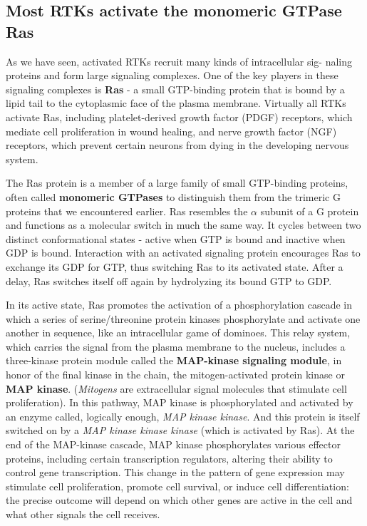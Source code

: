 \subsection{Most RTKs activate the monomeric GTPase Ras}

As we have seen, activated RTKs recruit many kinds of intracellular sig-
naling proteins and form large signaling complexes. One of the key players
in these signaling complexes is \textbf{Ras} - a small GTP-binding protein that is
bound by a lipid tail to the cytoplasmic face of the plasma membrane.
Virtually all RTKs activate Ras, including platelet-derived growth factor
(PDGF) receptors, which mediate cell proliferation in wound healing, and
nerve growth factor (NGF) receptors, which prevent certain neurons from
dying in the developing nervous system.

The Ras protein is a member of a large family of small GTP-binding
proteins, often called \textbf{monomeric GTPases} to distinguish them from
the trimeric G proteins that we encountered earlier. Ras resembles the
$\alpha$ subunit of a G protein and functions as a molecular switch in much
the same way. It cycles between two distinct conformational states -
active when GTP is bound and inactive when GDP is bound.
Interaction with an activated signaling protein encourages Ras
to exchange its GDP for GTP, thus switching Ras to its activated state.
After a delay, Ras switches itself off again by hydrolyzing
its bound GTP to GDP.

In its active state, Ras promotes the activation of a phosphorylation cascade
in which a series of serine/threonine protein kinases phosphorylate
and activate one another in sequence, like an intracellular game of dominoes.
This relay system, which carries the signal from
the plasma membrane to the nucleus, includes a three-kinase protein
module called the \textbf{MAP-kinase signaling module}, in honor of the final
kinase in the chain, the mitogen-activated protein kinase or \textbf{MAP kinase}.
(\textit{Mitogens} are extracellular signal molecules that stimulate cell proliferation).
In this pathway, MAP kinase is phosphorylated and activated by an
enzyme called, logically enough, \textit{MAP kinase kinase}. And this protein is
itself switched on by a \textit{MAP kinase kinase kinase} (which is activated by
Ras). At the end of the MAP-kinase cascade, MAP kinase phosphorylates
various effector proteins, including certain transcription regulators, altering
their ability to control gene transcription. This change in the pattern
of gene expression may stimulate cell proliferation, promote cell survival,
or induce cell differentiation: the precise outcome will depend on which
other genes are active in the cell and what other signals the cell receives.

